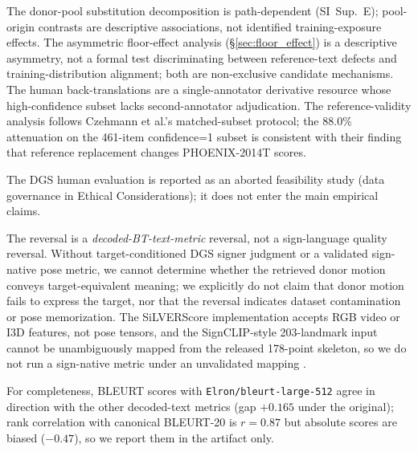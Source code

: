 \documentclass[pdflatex,sn-chicago]{sn-jnl}
\begin{document}
The donor-pool substitution decomposition is path-dependent (SI~Sup.~E); pool-origin contrasts are descriptive associations, not identified training-exposure effects. The asymmetric floor-effect analysis (\S\ref{sec:floor_effect}) is a descriptive asymmetry, not a formal test discriminating between reference-text defects and training-distribution alignment; both are non-exclusive candidate mechanisms. The human back-translations are a single-annotator derivative resource whose high-confidence subset lacks second-annotator adjudication. The reference-validity analysis follows Czehmann et al.'s matched-subset protocol; the $88.0\%$ attenuation on the 461-item confidence=1 subset is consistent with their finding that reference replacement changes PHOENIX-2014T scores.

The DGS human evaluation is reported as an aborted feasibility study (data governance in Ethical Considerations); it does not enter the main empirical claims.

The reversal is a \emph{decoded-BT-text-metric} reversal, not a sign-language quality reversal. Without target-conditioned DGS signer judgment or a validated sign-native pose metric, we cannot determine whether the retrieved donor motion conveys target-equivalent meaning; we explicitly do not claim that donor motion fails to express the target, nor that the reversal indicates dataset contamination or pose memorization. The SiLVERScore implementation accepts RGB video or I3D features, not pose tensors, and the SignCLIP-style 203-landmark input cannot be unambiguously mapped from the released 178-point skeleton, so we do not run a sign-native metric under an unvalidated mapping \cite{silverscore,jiang2025meaningful}.

For completeness, BLEURT scores with \texttt{Elron/bleurt-large-512} agree in direction with the other decoded-text metrics (gap $+0.165$ under the original); rank correlation with canonical BLEURT-20 is $r=0.87$ but absolute scores are biased ($-0.47$), so we report them in the artifact only.
\end{document}
